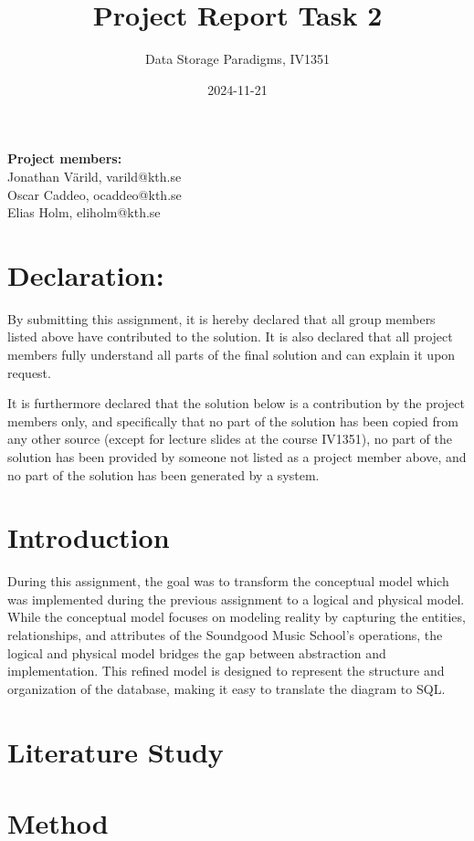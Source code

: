 \documentclass[a4paper]{scrartcl}
\title{Project Report Task 2}
\subtitle{Data Storage Paradigms, IV1351}
\author{}
\date{2024-11-21}
\begin{document}
\maketitle
\noindent\textbf{Project members:} \\ \hfill
Jonathan Värild, varild@kth.se \\ \hfill
Oscar Caddeo, ocaddeo@kth.se \\ \hfill
Elias Holm, eliholm@kth.se \\ \hfill

\section*{Declaration:}

By submitting this assignment, it is hereby declared that all group members listed above have contributed to the solution. It is also declared that all project members fully understand all parts of the final solution and can explain it upon request.

It is furthermore declared that the solution below is a contribution by the project members only, and specifically that no part of the solution has been copied from any other source (except for lecture slides at the course IV1351), no part of the solution has been provided by someone not listed as a project member above, and no part of the solution has been generated by a system.

\section{Introduction}

During this assignment, the goal was to transform the conceptual model which was implemented during the previous assignment to a logical and physical model. While the conceptual model focuses on modeling reality by capturing the entities, relationships, and attributes of the Soundgood Music School’s operations, the logical and physical model bridges the gap between abstraction and implementation. This refined model is designed to represent the structure and organization of the database, making it easy to translate the diagram to SQL.

\section{Literature Study}


\section{Method}
\end{document}
